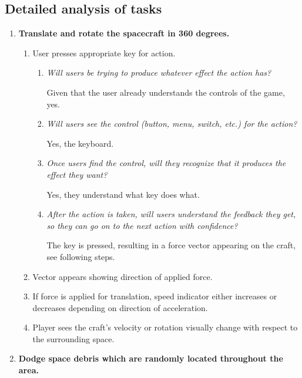 \subsection{Detailed analysis of tasks}
\begin{enumerate}

\item\textbf{Translate and rotate the spacecraft in 360 degrees.}
\begin{enumerate}

  \item User presses appropriate key for action.
  \begin{enumerate}
    \item \emph{Will users be trying to produce whatever effect the action has?}
		
    Given that the user already understands the controls of the game, yes.		
    \item \emph{Will users see the control (button, menu, switch, etc.) for the action?}
    
    Yes, the keyboard.
    \item \emph{Once users find the control, will they recognize that it produces the effect they want?}
    
    Yes, they understand what key does what.
    \item \emph{After the action is taken, will users understand the feedback they get, so they can go on to the next action with confidence?}
    
    The key is pressed, resulting in a force vector appearing on the craft, see following steps.
  \end{enumerate}

  \item Vector appears showing direction of applied force.

  \item If force is applied for translation, speed indicator either increases or decreases depending on direction of acceleration.

  \item Player sees the craft's velocity or rotation visually change with respect to the surrounding space.

\end{enumerate}

\item\textbf{Dodge space debris which are randomly located throughout the area.}
\begin{enumerate}


\end{enumerate}
\end{enumerate}
